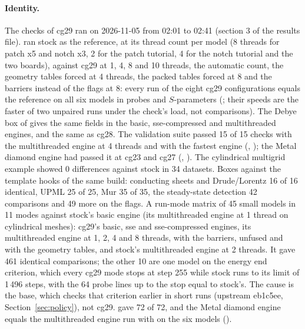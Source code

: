 \paragraph{Identity.} The checks of cg29 ran on 2026-11-05 from 02:01 to 02:41 (section 3 of the results file).
 ran stock as the reference, at its thread count per model (8 threads for patch x5 and notch x3, 2 for
the patch tutorial, 4 for the notch tutorial and the two boards), against cg29 at 1, 4, 8 and 10 threads, the
automatic count,
the geometry tables forced at 4 threads, the packed tables forced at 8 and the barriers instead of the flags at 8:
every run of the eight cg29 configurations equals the reference on all six models in probes and $S$-parameters
(; their speeds are the faster of two unpaired runs under the check's load, not
comparisons). The Debye box of
 gives the same fields in the basic, sse-compressed and multithreaded engines, and the same as
cg28. The validation suite passed 15 of 15 checks with the multithreaded engine at 4 threads and with the fastest
engine (, ); the Metal diamond engine had
passed it at cg23 and cg27 (, ). The cylindrical
multigrid example showed 0 differences against stock in 34 datasets. Boxes against the template hooks of the same
build: conducting sheets and Drude/Lorentz 16 of 16 identical, UPML 25 of 25, Mur 35 of 35, the steady-state detection
42 comparisons and 49 more on the flags. A run-mode matrix of 45 small models in 11 modes against stock's basic engine
(its multithreaded engine at 1 thread on cylindrical meshes): cg29's basic, sse and sse-compressed engines, its
multithreaded engine at 1, 2, 4 and 8 threads, with the barriers, unfused and with the geometry tables, and stock's
multithreaded engine at 2 threads. It gave 461 identical comparisons; the other 10 are one model on the energy end
criterion, which every cg29 mode stops at step 255 while stock runs to its limit of 1\,496 steps, with the 64 probe
lines up to the stop equal to stock's. The cause is the base, which checks that criterion earlier in short runs
(upstream eb1c5ee, Section~\ref{sec:policy}), not cg29.  gave 72 of 72, and the Metal diamond
engine equals the multithreaded engine run with  on the six models ().

